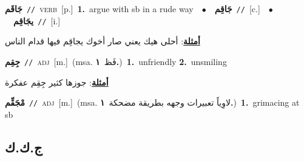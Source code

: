 \documentclass[10pt,a4paper,twoside]{article} %
\begin{document}
\begin{multicols}{2}
{\setlength\topsep{0pt}\textbf{\foreignlanguage{arabic}{جَاقَم}}\ {\color{gray}\texttt{//}\color{black}}\ \textsc{verb}\ [p.]\ \textbf{1.}~argue with sb in a rude way\ \ $\bullet$\ \ \setlength\topsep{0pt}\textbf{\foreignlanguage{arabic}{جَاقِم}}\ {\color{gray}\texttt{//}\color{black}}\ [c.]\ \ $\bullet$\ \ \setlength\topsep{0pt}\textbf{\foreignlanguage{arabic}{يجَاقِم}}\ {\color{gray}\texttt{//}\color{black}}\ [i.]\  \begin{flushright}\color{gray}\foreignlanguage{arabic}{\textbf{\underline{\foreignlanguage{arabic}{أمثلة}}}: أحلى هيك يعني صار أخوك يجاقِم فيها قدام الناس}\end{flushright}\color{black}} \vspace{2mm}

{\setlength\topsep{0pt}\textbf{\foreignlanguage{arabic}{جِقِم}}\ {\color{gray}\texttt{//}\color{black}}\ \textsc{adj}\ [m.]\ \color{gray}(msa. \foreignlanguage{arabic}{فَظ}~\foreignlanguage{arabic}{\textbf{١.}})\color{black}\ \textbf{1.}~unfriendly  \textbf{2.}~unsmiling\  \begin{flushright}\color{gray}\foreignlanguage{arabic}{\textbf{\underline{\foreignlanguage{arabic}{أمثلة}}}: جوزها كثير جِقِم عفكرة}\end{flushright}\color{black}} \vspace{2mm}

{\setlength\topsep{0pt}\textbf{\foreignlanguage{arabic}{مْجَقِّم}}\ {\color{gray}\texttt{//}\color{black}}\ \textsc{adj}\ [m.]\ \color{gray}(msa. \foreignlanguage{arabic}{لاوِياً تعبيرات وجهه بطريقة مضحكة}~\foreignlanguage{arabic}{\textbf{١.}})\color{black}\ \textbf{1.}~grimacing at sb\ } \vspace{2mm}

\vspace{-3mm}
\subsection*{\color{blue}\foreignlanguage{arabic}{ج.ك.ك}\color{blue}{}} 


\end{multicols}
\end{document}
